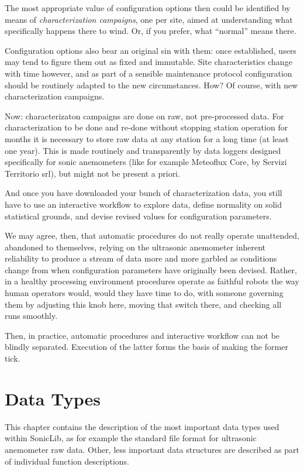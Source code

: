 \documentclass[a4paper,10pt]{book}
\begin{document}
The most appropriate value of configuration options then could be identified by means of \emph{characterization campaigns}, one per site, aimed at understanding what specifically happens there to wind. Or, if you prefer, what ``normal'' means there.

Configuration options also bear an original sin with them: once established, users may tend to figure them out as fixed and immutable. Site characteristics change with time however, and as part of a sensible maintenance protocol configuration should be routinely adapted to the new circumstances. How? Of course, with new characterization campaigns.

Now: characterizaton campaigns are done on raw, not pre-processed data. For characterization to be done and re-done without stopping station operation for months it is necessary to store raw data at any station for a long time (at least one year). This is made routinely and transparently by data loggers designed specifically for sonic anemometers (like for example Meteoflux Core, by Servizi Territorio srl), but might not be present a priori.

And once you have downloaded your bunch of characterization data, you still have to use an interactive workflow to explore data, define normality on solid statistical grounds, and devise revised values for configuration parameters.

We may agree, then, that automatic procedures do not really operate unattended, abandoned to themselves, relying on the ultrasonic anemometer inherent reliability to produce a stream of data more and more garbled as conditions change from when configuration parameters have originally been devised. Rather, in a healthy processing environment procedures operate as faithful robots the way human operators would, would they have time to do, with someone governing them by adjusting this knob here, moving that switch there, and checking all runs smoothly.

Then, in practice, automatic procedures and interactive workflow can not be blindly separated. Execution of the latter forms the basis of making the former tick.

\chapter{Data Types}
\label{chap:DataTypes}

This chapter contains the description of the most important data types used within SonicLib, as for example the standard file format for ultrasonic anemometer raw data. Other, less important data structures are described as part of individual function descriptions.
\end{document}
